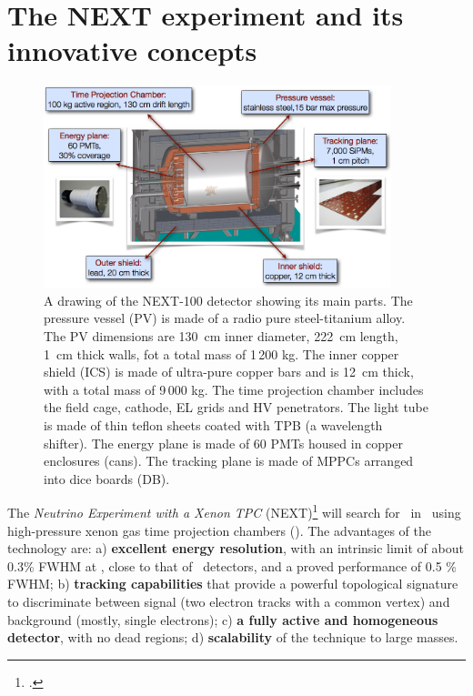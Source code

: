 \section*{The NEXT experiment and its innovative concepts}
\begin{figure}
\centering
\includegraphics[width=0.9\textwidth]{img/NEXT.png}
\caption{\small A drawing of the NEXT-100 detector showing its main parts. The pressure vessel (PV) is made of a radio pure steel-titanium alloy. The PV dimensions are 130~cm inner diameter, 222~cm length, 1~cm thick walls, fot a total mass of 1\,200 kg. The inner copper shield (ICS) is made of ultra-pure copper bars and is 12~cm thick, with a total mass of 9\,000 kg. The time projection chamber includes the field cage, cathode, EL grids and HV penetrators.
The light tube is made of thin teflon sheets coated with TPB (a wavelength shifter). 
The energy plane is made of 60 PMTs housed in copper enclosures (cans).
The tracking plane is made of MPPCs arranged into dice boards (DB). 
} \label{fig.NEXT100}
\end{figure}

The \emph{Neutrino Experiment with a Xenon TPC} (NEXT)\footcite{next} will search for \bbonu\ in \XE\ using  high-pressure xenon gas  time projection chambers (\HPXE). The advantages of the technology are: 
a) {\bf excellent energy resolution}, with an intrinsic limit of about 0.3\% FWHM at \Qbb, close to that of \GE\ detectors, and a proved performance of 0.5 \% FWHM; b)
{\bf tracking capabilities} that provide a powerful topological signature to discriminate between signal (two electron tracks with a common vertex) and background (mostly, single electrons); c)
{\bf a fully active and homogeneous detector}, with no dead regions; d) {\bf scalability} of the technique to large masses. 

